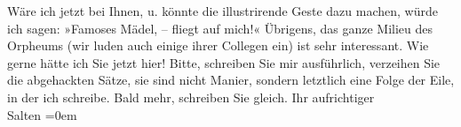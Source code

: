 \begin{ledgroupsized}[t]{13cm}
           Wäre ich jetzt bei Ihnen, u. könnte die illustrirende Geste dazu
                  machen, würde ich sagen: »Famoses Mädel, – fliegt \label{K_L03103-2v}\label{K_L03103-2h} auf mich!«\pend
           \pstart
           Übrigens, das ganze Milieu des Orpheums (wir luden
               auch einige ihrer Collegen ein) ist sehr interessant.\pend
           \pstart
           Wie gerne hätte ich Sie jetzt hier!\pend
           \pstart
           Bitte, schreiben Sie mir ausführlich, verzeihen Sie die abgehackten Sätze, sie sind
               nicht Manier, sondern letztlich eine Folge der Eile, in der ich schreibe.\pend
           \pstart
           Bald mehr, schreiben Sie gleich. Ihr aufrichtiger {\\[\baselineskip]}\spacefill\mbox{Salten}\pend
           \leftskip=0em{}
         
         \endnumbering{}\end{ledgroupsized}  \newcommand{\dateiname}{L03103}\newcommand{\titel}{Felix Salten an Arthur Schnitzler, 2. 9. 1891}\newcommand{\editorInnen}{Martin Anton Müller und Laura Untner}
      